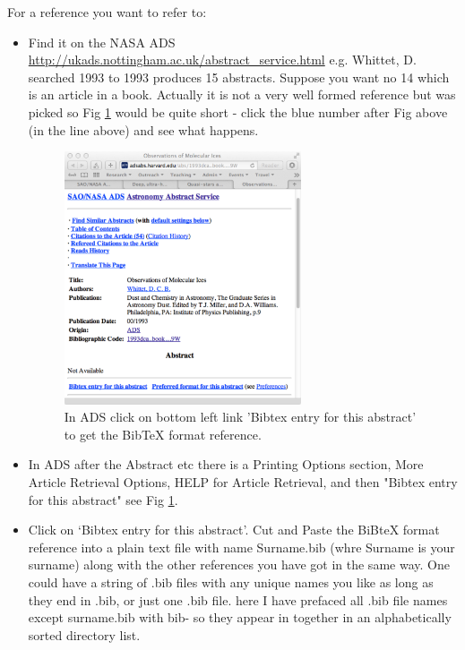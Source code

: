 \documentclass[twoside, fontsize=12pt,
     bibliography=totoc, %
     listof=totoc, %
     index=totoc, %
     onehalfspacing %
]{_MScDiss2017_cls}
\begin{document}
For a reference you want to refer to:
\begin{itemize}
\item Find it on the NASA ADS  \url{http://ukads.nottingham.ac.uk/abstract_service.html} 
e.g. Whittet, D.  searched 1993 to 1993 produces 15 abstracts. Suppose you want no 14  which is an article in a book.
Actually it is not a very well formed reference but was picked so Fig \ref{fig_bibads} would be quite short - click the blue number after Fig above (in the line above) and see what happens.
\begin{figure}[hbtp]
  \centering
  \includegraphics[width=70mm]{fig-bib}  %
  \caption[Get BibTeX format reference from ADS.]%
  {In ADS click on bottom left link 'Bibtex entry for this abstract' to get the BibTeX format reference.}%
  \label{fig_bibads}
\end{figure}
\item In ADS after the Abstract etc there is a Printing Options section, More Article Retrieval Options, HELP for Article Retrieval, and then "Bibtex entry for this abstract" see Fig \ref{fig_bibads}. 
\item Click on \lq Bibtex entry for this abstract\rq. Cut and Paste the BiBteX format reference into a plain text file with name Surname.bib (whre Surname is your surname) along with the other references you have got in the same way.  One could have a string of .bib files with any unique names you like as long as they end in .bib, or just one .bib file. here I have prefaced all .bib file names except surname.bib with bib- so they appear in together in an alphabetically sorted directory list.
\end{itemize}
\end{document}
